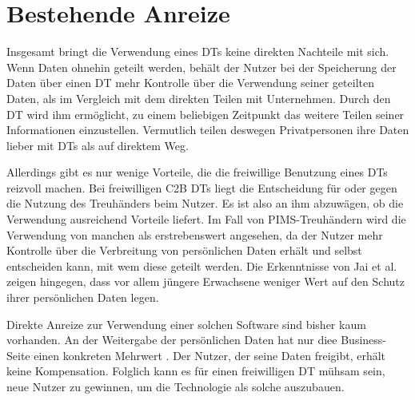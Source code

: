 \documentclass[
	fontsize=11pt,
	headings=small,
	parskip=half,           %
	bibliography=totoc,
	numbers=noenddot,       %
	open=any,               %
]{scrreprt}
\begin{document}


\section{Bestehende Anreize}
Insgesamt bringt die Verwendung eines DTs keine direkten Nachteile mit sich. Wenn Daten ohnehin geteilt werden, behält der Nutzer bei der Speicherung der Daten über einen DT mehr Kontrolle über die Verwendung seiner geteilten Daten, als im Vergleich mit dem direkten Teilen mit Unternehmen. Durch den DT wird ihm ermöglicht, zu einem beliebigen Zeitpunkt das weitere Teilen seiner Informationen einzustellen. Vermutlich teilen deswegen Privatpersonen ihre Daten lieber mit DTs als auf direktem Weg. \cite{dt-tresor24study}

Allerdings gibt es nur wenige Vorteile, die die freiwillige Benutzung eines DTs reizvoll machen. Bei freiwilligen C2B DTs liegt die Entscheidung für oder gegen die Nutzung des Treuhänders beim Nutzer. Es ist also an ihm abzuwägen, ob die Verwendung ausreichend Vorteile liefert. Im Fall von PIMS-Treuhändern wird die Verwendung von manchen als erstrebenswert angesehen, da der Nutzer mehr Kontrolle über die Verbreitung von persönlichen Daten erhält und selbst entscheiden kann, mit wem diese geteilt werden. Die Erkenntnisse von Jai et al. \cite{dt-jai2016privacy} zeigen hingegen, dass vor allem jüngere Erwachsene weniger Wert auf den Schutz ihrer persönlichen Daten legen.

Direkte Anreize zur Verwendung einer solchen Software sind bisher kaum vorhanden. An der Weitergabe der persönlichen Daten hat nur diee Business-Seite einen konkreten Mehrwert . Der Nutzer, der seine Daten freigibt, erhält keine Kompensation. Folglich kann es für einen freiwilligen DT mühsam sein, neue Nutzer zu gewinnen, um die Technologie als solche auszubauen.


\end{document}
